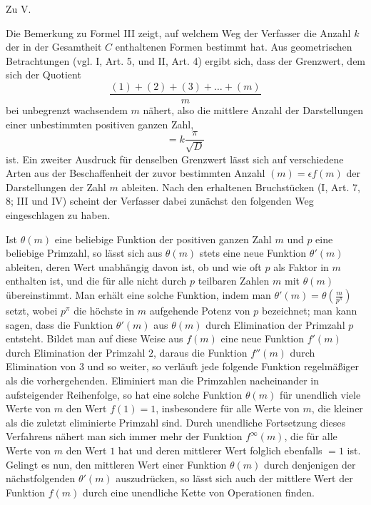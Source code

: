 \par\medskip{}\centerline{Zu V.}\smallskip
Die Bemerkung zu Formel III zeigt, auf welchem Weg der Verfasser die Anzahl $k$ der in der Gesamtheit $C$ enthaltenen Formen bestimmt hat. Aus geometrischen Betrachtungen (vgl. I, Art. 5, und II, Art. 4) ergibt sich, dass der Grenzwert, dem sich der Quotient
\[
\frac{(1)+(2)+(3)+\ldots+(m)}m
\]
bei unbegrenzt wachsendem $m$ nähert, also die mittlere Anzahl der Darstellungen einer unbestimmten positiven ganzen Zahl,
\[
=k\frac\pi{\surd D}
\]
ist. Ein zweiter Ausdruck für denselben Grenzwert lässt sich auf verschiedene Arten aus der Beschaffenheit der zuvor bestimmten Anzahl $(m)=\epsilon f(m)$ der Darstellungen der Zahl $m$ ableiten. Nach den erhaltenen Bruchstücken (I, Art. 7, 8; III und IV) scheint der Verfasser dabei zunächst den folgenden Weg eingeschlagen zu haben.

Ist $\theta(m)$ eine beliebige Funktion der positiven ganzen Zahl $m$ und $p$ eine beliebige Primzahl, so lässt sich aus $\theta(m)$ stets eine neue Funktion $\theta'(m)$ ableiten, deren Wert unabhängig davon ist, ob und wie oft $p$ als Faktor in $m$ enthalten ist, und die für alle nicht durch $p$ teilbaren Zahlen $m$ mit $\theta(m)$ übereinstimmt. Man erhält eine solche Funktion, indem man $\theta'(m)=\theta\left(\frac m{p^\pi}\right)$ setzt, wobei $p^\pi$ die höchste in $m$ aufgehende Potenz von $p$ bezeichnet; man kann sagen, dass die Funktion $\theta'(m)$ aus $\theta(m)$ durch Elimination der Primzahl $p$ entsteht. Bildet man auf diese Weise aus $f(m)$ eine neue Funktion $f'(m)$ durch Elimination der Primzahl $2$, daraus die Funktion $f''(m)$ durch Elimination von $3$ und so weiter, so verläuft jede folgende Funktion regelmäßiger als die vorhergehenden. Eliminiert man die Primzahlen nacheinander in aufsteigender Reihenfolge, so hat eine solche Funktion
$\theta(m)$ für unendlich viele Werte von $m$ den Wert $f(1)=1$, insbesondere für alle Werte von $m$, die kleiner als die zuletzt eliminierte Primzahl sind. Durch unendliche Fortsetzung dieses Verfahrens nähert man sich immer mehr der Funktion $f^\infty(m)$, die für alle Werte von $m$ den Wert $1$ hat und deren mittlerer Wert folglich ebenfalls $=1$ ist. Gelingt es nun, den mittleren Wert einer Funktion $\theta(m)$ durch denjenigen der nächstfolgenden $\theta'(m)$ auszudrücken, so lässt sich auch der mittlere Wert der Funktion $f(m)$ durch eine unendliche Kette von Operationen finden.


